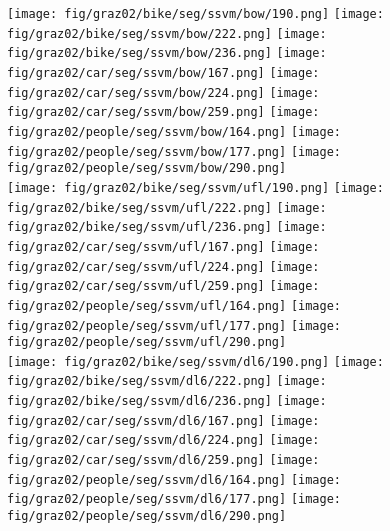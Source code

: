 \documentclass[10pt,3p]{elsarticle}
\begin{document}
\begin{figure}[t]
     
     \texttt{[image: fig/graz02/bike/seg/ssvm/bow/190.png]}
     \texttt{[image: fig/graz02/bike/seg/ssvm/bow/222.png]}
     \texttt{[image: fig/graz02/bike/seg/ssvm/bow/236.png]}       
	\texttt{[image: fig/graz02/car/seg/ssvm/bow/167.png]}                  
    \texttt{[image: fig/graz02/car/seg/ssvm/bow/224.png]}
     \texttt{[image: fig/graz02/car/seg/ssvm/bow/259.png]}  
     \texttt{[image: fig/graz02/people/seg/ssvm/bow/164.png]}   
     \texttt{[image: fig/graz02/people/seg/ssvm/bow/177.png]} 
     \texttt{[image: fig/graz02/people/seg/ssvm/bow/290.png]} \\
     
     \texttt{[image: fig/graz02/bike/seg/ssvm/ufl/190.png]}
     \texttt{[image: fig/graz02/bike/seg/ssvm/ufl/222.png]}
     \texttt{[image: fig/graz02/bike/seg/ssvm/ufl/236.png]}       
	\texttt{[image: fig/graz02/car/seg/ssvm/ufl/167.png]}                  
    \texttt{[image: fig/graz02/car/seg/ssvm/ufl/224.png]}
     \texttt{[image: fig/graz02/car/seg/ssvm/ufl/259.png]}  
     \texttt{[image: fig/graz02/people/seg/ssvm/ufl/164.png]}   
     \texttt{[image: fig/graz02/people/seg/ssvm/ufl/177.png]} 
     \texttt{[image: fig/graz02/people/seg/ssvm/ufl/290.png]} \\
     
     
     \texttt{[image: fig/graz02/bike/seg/ssvm/dl6/190.png]}
     \texttt{[image: fig/graz02/bike/seg/ssvm/dl6/222.png]}
     \texttt{[image: fig/graz02/bike/seg/ssvm/dl6/236.png]}       
	\texttt{[image: fig/graz02/car/seg/ssvm/dl6/167.png]}                  
    \texttt{[image: fig/graz02/car/seg/ssvm/dl6/224.png]}
     \texttt{[image: fig/graz02/car/seg/ssvm/dl6/259.png]}  
     \texttt{[image: fig/graz02/people/seg/ssvm/dl6/164.png]}   
     \texttt{[image: fig/graz02/people/seg/ssvm/dl6/177.png]} 
     \texttt{[image: fig/graz02/people/seg/ssvm/dl6/290.png]} \\


\end{figure}
\end{document}
